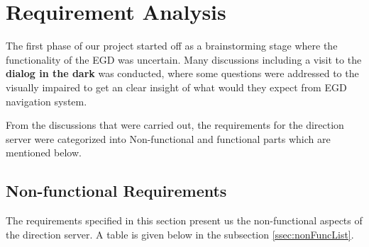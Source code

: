 \newpage
\chapter{Requirement Analysis}
    The first phase of our project started off as a brainstorming stage where the functionality
    of the EGD was uncertain. Many discussions including a visit to the \textbf{dialog in the dark} 
    was conducted, where some questions were addressed to the visually impaired to get an clear insight
    of what would they expect from EGD navigation system. 
\par
    From the discussions that were carried out, the requirements for the direction server were
    categorized into Non-functional and functional parts which are mentioned below.
    \section{Non-functional Requirements}
        The requirements specified in this section present us the non-functional aspects of the 
        direction server. A table is given below in the subsection 
        \ref{ssec:nonFuncList}.

        \newpage

